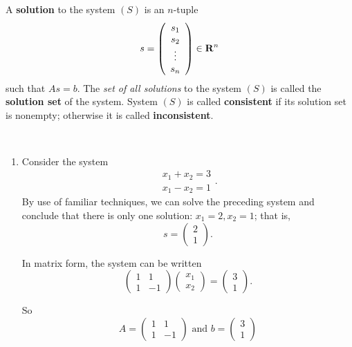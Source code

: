 \begin{additional definition}
A \textbf{solution} to the system \((S)\) is an \(n\)-tuple
\[
    s = \left(\begin{array}{c} s_{1} \\ s_{2} \\ \vdots \\ s_{n} \end{array}\right) \in \mathbf{R}^{n}
\]
such that \(As = b\).
The \emph{set of all solutions} to the system \((S)\) is called the \textbf{solution set} of the system.
System \((S)\) is called \textbf{consistent} if its solution set is nonempty;
otherwise it is called \textbf{inconsistent}.
\end{additional definition}

\begin{example} \label{example 3.3.1} \ 

\begin{enumerate}
\item Consider the system
\[
    \begin{array}{l}
        x_1 + x_2 = 3 \\
        x_1 - x_2 = 1
    \end{array}.
\]
By use of familiar techniques, we can solve the preceding system and conclude that there is only one solution: \(x_1 = 2, x_2 =1\);
that is,
\[
    s = \left(\begin{array}{l} 2 \\ 1 \end{array}\right).
\]

In matrix form, the system can be written
\[
    \left(\begin{array}{rr} 1 & 1 \\ 1 & -1 \end{array}\right)
    \left(\begin{array}{l} x_1 \\ x_2 \end{array}\right)
    = \left(\begin{array}{l} 3 \\ 1 \end{array}\right).
\]

So
\[
    A = \left(\begin{array}{rr} 1 & 1 \\ 1 & -1 \end{array}\right) \text { and }
    b = \left(\begin{array}{l} 3 \\ 1 \end{array}\right)
\]


\end{enumerate}
\end{example}
